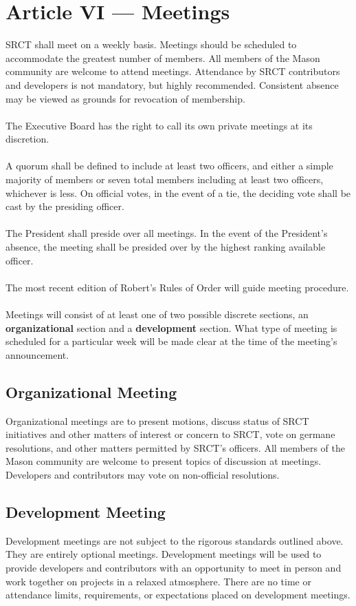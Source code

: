 \documentclass{article}
\begin{document}
  \section{Article VI --- Meetings}
  SRCT shall meet on a weekly basis. Meetings should be scheduled to 
  accommodate the greatest number of members. All members of the Mason
  community are welcome to attend meetings. Attendance by SRCT 
  contributors and developers is not mandatory, but highly recommended. 
  Consistent absence may be viewed as grounds for revocation of 
  membership.
  \\ \\
  The Executive Board has the right to call its own private meetings at
  its discretion.
  \\ \\
  A quorum shall be defined to include at least two officers, and either 
  a simple majority of members or seven total members including at least
  two officers, whichever is less. On official votes, in the event of a 
  tie, the deciding vote shall be cast by the presiding officer.
  \\ \\
  The President shall preside over all meetings. In the event of the 
  President's absence, the meeting shall be presided over by the highest
  ranking available officer.
  \\ \\
  The most recent edition of Robert's Rules of Order will guide meeting 
  procedure.
  \\ \\
  Meetings will consist of at least one of two possible discrete 
  sections, an \textbf{organizational} section and a 
  \textbf{development} section. What type of meeting is scheduled for a
  particular week will be made clear at the time of the meeting's 
  announcement.
  
  \subsection{Organizational Meeting}
  Organizational meetings are to present motions, discuss status of SRCT 
  initiatives and other matters of interest or concern to SRCT, vote on 
  germane resolutions, and other matters permitted by SRCT's officers. 
  All members of the Mason community are welcome to present topics of 
  discussion at meetings. Developers and contributors may vote on 
  non-official resolutions.
  
  \subsection{Development Meeting}
  Development meetings are not subject to the rigorous standards 
  outlined above. They are entirely optional meetings. Development 
  meetings will be used to provide developers and contributors with an 
  opportunity to meet in person and work together on projects in a 
  relaxed atmosphere. There are no time or attendance limits, 
  requirements, or expectations placed on development meetings.
  
\end{document}

